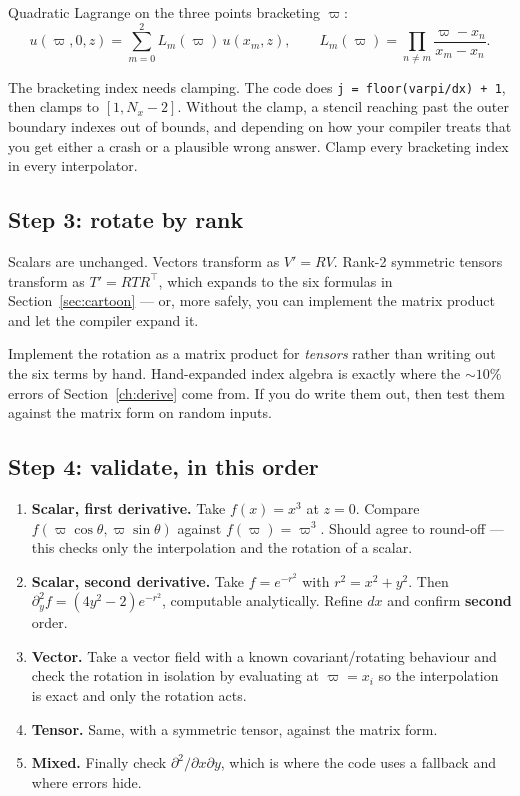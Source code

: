 Quadratic Lagrange on the three points bracketing $\varpi$:
\begin{equation}
u(\varpi,0,z) = \sum_{m=0}^{2} L_m(\varpi)\, u(x_m, z), \qquad
L_m(\varpi) = \prod_{n\neq m}\frac{\varpi - x_n}{x_m - x_n}.
\end{equation}

\gotcha
The bracketing index needs clamping. The code does
\texttt{j = floor(varpi/dx) + 1}, then clamps to $[1, N_x-2]$. Without the
clamp, a stencil reaching past the outer boundary indexes out of bounds, and
depending on how your compiler treats that you get either a crash or a
plausible wrong answer. Clamp every bracketing index in every interpolator.

\subsection{Step 3: rotate by rank}

Scalars are unchanged. Vectors transform as $V' = R V$. Rank-2 symmetric
tensors transform as $T' = R T R^\top$, which expands to the six formulas in
Section~\ref{sec:cartoon} --- or, more safely, you can implement the matrix
product and let the compiler expand it.

\gotcha
Implement the rotation as a matrix product for \emph{tensors} rather than
writing out the six terms by hand. Hand-expanded index algebra is exactly
where the $\sim 10\%$ errors of Section~\ref{ch:derive} come from. If you do
write them out, then test them against the matrix form on random inputs.

\subsection{Step 4: validate, in this order}

\begin{enumerate}
\item \textbf{Scalar, first derivative.} Take $f(x) = x^3$ at $z=0$.
      Compare $f(\varpi\cos\theta, \varpi\sin\theta)$ against
      $f(\varpi) = \varpi^3$. Should agree to round-off --- this checks only
      the interpolation and the rotation of a scalar.
\item \textbf{Scalar, second derivative.} Take $f = e^{-r^2}$ with
      $r^2 = x^2+y^2$. Then $\partial_y^2 f = (4y^2-2)e^{-r^2}$, computable
      analytically. Refine $dx$ and confirm \textbf{second} order.
\item \textbf{Vector.} Take a vector field with a known covariant/rotating
      behaviour and check the rotation in isolation by evaluating at
      $\varpi = x_i$ so the interpolation is exact and only the rotation acts.
\item \textbf{Tensor.} Same, with a symmetric tensor, against the matrix form.
\item \textbf{Mixed.} Finally check $\partial^2/\partial x\partial y$, which
      is where the code uses a fallback and where errors hide.
\end{enumerate}

